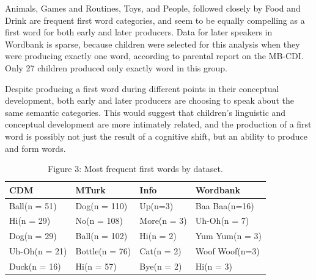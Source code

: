 \documentclass[10pt,letterpaper]{article}
\begin{document}
Animals, Games and Routines, Toys, and People, followed closely by Food and Drink are frequent first word categories, and seem to be equally compelling as a first word for both early and later producers. Data for later speakers in Wordbank is sparse, because children were selected for this analysis when they were producing exactly one word, according to parental report on the MB-CDI. Only 27 children produced only exactly word in this group.

Despite producing a first word during different points in their conceptual development, both early and later producers are choosing to speak about the same semantic categories. This would suggest that children's linguistic and conceptual development are more intimately related, and the production of a first word is possibly not just the result of a cognitive shift, but an ability to produce and form words.



\begin{table}[h]
\begin{center}
\begin{tabular}{ | p{1.8cm} | p{1.8cm} | p{1.8cm} | p{1.8cm} | }
    \hline
    CDM & MTurk & Info & Wordbank \\ \hline
    Ball\newline(n = 51) & Dog\newline(n = 110) & Up\newline (n=3) & Baa Baa\newline (n=16) \\ \hline
    Hi\newline (n = 29) & No\newline (n = 108) & More\newline (n = 3) & Uh-Oh\newline (n = 7) \\ \hline
    Dog\newline (n = 29) & Ball\newline (n = 102) & Hi\newline (n = 2) & Yum Yum\newline (n = 3) \\ \hline
    Uh-Oh\newline (n = 21) & Bottle\newline (n = 76) & Cat\newline (n = 2) & Woof Woof\newline (n=3) \\ \hline
    Duck\newline (n = 16) & Hi\newline (n = 57) & Bye\newline (n = 2) & Hi\newline (n = 3) \\ \hline		
    \end{tabular}
\caption{Figure 3: Most frequent first words by dataset.}\
\end{center}
\end{table}
\end{document}
